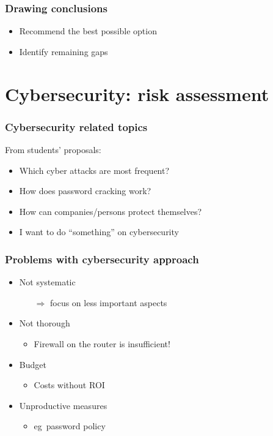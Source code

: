\documentclass[aspectratio=169]{beamer}
\begin{document}
\begin{frame}
  \frametitle{Drawing conclusions}

  \begin{itemize}
    \item Recommend the best possible option
    \item Identify remaining gaps
  \end{itemize}
\end{frame}

\section{Cybersecurity: risk assessment}

\begin{frame}
  \frametitle{Cybersecurity related topics}

  From students' proposals:

  \begin{itemize}
    \item Which cyber attacks are most frequent?
    \item How does password cracking work?
    \item How can companies/persons protect themselves?
    \item I want to do ``something'' on cybersecurity
  \end{itemize}

  \bigskip


\end{frame}

\begin{frame}
  \frametitle{Problems with cybersecurity approach}

  \begin{itemize}
    \item Not systematic
          \begin{itemize}
            \item[$\Rightarrow$]focus on less important aspects
          \end{itemize}
    \item Not thorough
          \begin{itemize}
            \item Firewall on the router is insufficient!
          \end{itemize}
    \item Budget
          \begin{itemize}
            \item Costs without ROI
          \end{itemize}
    \item Unproductive measures
          \begin{itemize}
            \item eg\ password policy
          \end{itemize}
  \end{itemize}

\end{frame}
\end{document}
